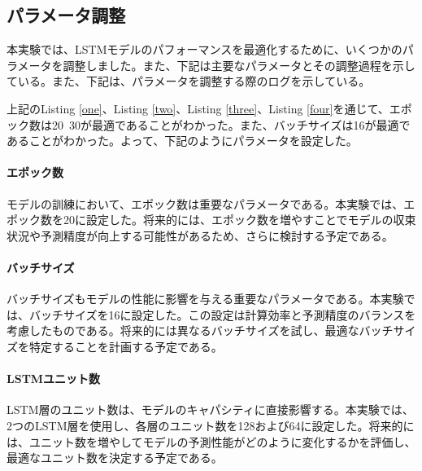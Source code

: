 \documentclass[a4paper, 11pt, titlepage]{jsarticle}
\begin{document}
\subsection{パラメータ調整}
\indent 本実験では、LSTMモデルのパフォーマンスを最適化するために、いくつかのパラメータを調整しました。また、下記は主要なパラメータとその調整過程を示している。また、下記は、パラメータを調整する際のログを示している。





\indent 上記のListing \ref{one}、Listing \ref{two}、Listing \ref{three}、Listing \ref{four}を通じて、エポック数は20~30が最適であることがわかった。また、バッチサイズは16が最適であることがわかった。よって、下記のようにパラメータを設定した。
\paragraph{エポック数}
\indent モデルの訓練において、エポック数は重要なパラメータである。本実験では、エポック数を20に設定した。将来的には、エポック数を増やすことでモデルの収束状況や予測精度が向上する可能性があるため、さらに検討する予定である。

\paragraph{バッチサイズ}
\indent バッチサイズもモデルの性能に影響を与える重要なパラメータである。本実験では、バッチサイズを16に設定した。この設定は計算効率と予測精度のバランスを考慮したものである。将来的には異なるバッチサイズを試し、最適なバッチサイズを特定することを計画する予定である。

\paragraph{LSTMユニット数}
\indent LSTM層のユニット数は、モデルのキャパシティに直接影響する。本実験では、2つのLSTM層を使用し、各層のユニット数を128および64に設定した。将来的には、ユニット数を増やしてモデルの予測性能がどのように変化するかを評価し、最適なユニット数を決定する予定である。
\end{document}
